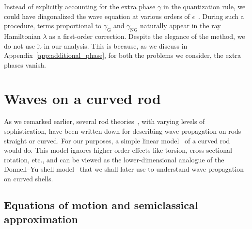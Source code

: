 
Instead of explicitly accounting for the extra phase $\gamma$ in the quantization rule, we could have diagonalized the wave equation at various orders of $\epsilon$~\cite{littlejohn1991,littlejohn1991a,weigert1993,venaille2023}.
During such a procedure, terms proportional to $\dot{\gamma}_{\text{G}}$ and $\dot{\gamma}_{\text{NG}}$ naturally appear in the ray Hamiltonian $\lambda$ as a first-order correction.
Despite the elegance of the method, we do not use it in our analysis.
This is because, as we discuss in Appendix~\ref{app:additional_phase}, for both the problems we consider, the extra phases vanish.

\section{Waves on a curved rod}
\label{sec:rods}

As we remarked earlier, several rod theories~\cite{chidamparam1993,walsh2000}, with varying levels of sophistication, have been written down for describing wave propagation on rods---straight or curved.
For our purposes, a simple linear model~\cite{kernes2021} of a curved rod would do.
This model ignores higher-order effects like torsion, cross-sectional rotation, etc., and can be viewed as the lower-dimensional analogue of the Donnell--Yu shell model~\cite{donnell1933,yu1955} that we shall later use to understand wave propagation on curved shells.

\subsection{Equations of motion and semiclassical approximation}
\label{sec:rod_equations}

